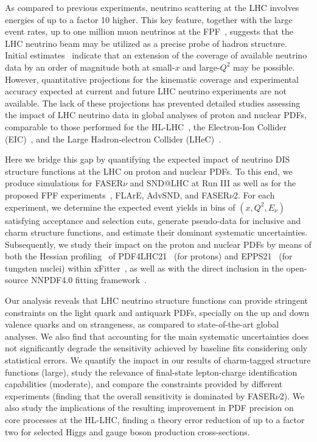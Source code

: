 As compared to  previous experiments,  neutrino
scattering at the LHC involves energies of up to a factor 10  higher.
%
This key feature, together with the large event rates,
up to one million muon neutrinos at the FPF~\cite{Kling:2021gos},
suggests that the LHC  neutrino beam may be utilized
as a precise probe of hadron structure.
%
Initial estimates~\cite{Feng:2022inv} indicate that an extension of the coverage of
available neutrino data by an order of magnitude both at small-$x$
and large-$Q^2$ may be possible.
%
However, quantitative projections for the kinematic coverage
and experimental accuracy expected at current
and future LHC neutrino experiments are not available.
%
The lack of these projections has prevented detailed studies assessing the impact
of LHC neutrino data in global analyses of proton and nuclear PDFs, comparable to
those performed for the HL-LHC~\cite{AbdulKhalek:2018rok,Azzi:2019yne}, the Electron-Ion Collider (EIC)~\cite{AbdulKhalek:2021gbh,Khalek:2021ulf,AbdulKhalek:2019mzd}, and the
Large Hadron-electron Collider (LHeC)~\cite{AbdulKhalek:2019mps,LHeC:2020van,LHeCStudyGroup:2012zhm}. 

Here we bridge this gap by quantifying
the expected impact of  neutrino DIS structure functions at the LHC on proton and nuclear PDFs.
%
To this end, we produce simulations for  FASER$\nu$ and SND@LHC at Run III 
as well as for the proposed FPF experiments~\cite{Anchordoqui:2021ghd,Feng:2022inv,Batell:2021blf,Batell:2021aja}, FLArE, AdvSND, and FASER$\nu$2.
%
For each experiment, we determine the expected event yields in bins of $(x,Q^2,E_\nu)$
satisfying acceptance and selection cuts,
generate pseudo-data for  inclusive and charm 
structure functions, 
and estimate their dominant systematic uncertainties.
%
Subsequently, we study their impact on the proton and nuclear PDFs by means of both the Hessian profiling~\cite{Paukkunen:2014zia,  Schmidt:2018hvu, AbdulKhalek:2018rok, HERAFitterdevelopersTeam:2015cre}
of  PDF4LHC21~\cite{PDF4LHCWorkingGroup:2022cjn} (for protons) and EPPS21~\cite{Eskola:2021nhw}
(for tungsten nuclei)
within {\sc\small xFitter}~\cite{Alekhin:2014irh, Bertone:2017tig, xFitter:2022zjb, xFitter:web},
as well as with the direct inclusion in the open-source NNPDF4.0 fitting framework~\cite{NNPDF:2021uiq}.

Our analysis reveals that  LHC neutrino structure functions can provide  stringent constraints
on the light quark and antiquark PDFs, specially on the up and down
valence quarks and on strangeness, as compared to state-of-the-art global analyses.
%
We also  find that accounting for the main systematic uncertainties does not significantly
degrade the sensitivity achieved by baseline fits considering only statistical errors.
%
We quantify the impact in our results of charm-tagged structure functions (large), study the relevance
of final-state lepton-charge identification capabilities (moderate), and compare the constraints
provided by different experiments (finding that the overall sensitivity is dominated by FASER$\nu$2).
%
We also study the implications of the resulting improvement in PDF precision
on core processes at the HL-LHC, finding a theory error reduction
of up to a factor two for selected  Higgs and gauge boson production
cross-sections. 

